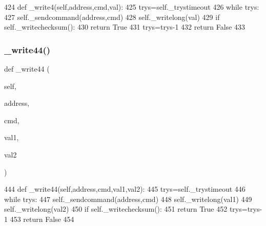 \begin{DoxyCode}
424     \textcolor{keyword}{def }\_write4(self,address,cmd,val):
425         trys=self.\_trystimeout
426         \textcolor{keywordflow}{while} trys:
427             self.\_sendcommand(address,cmd)
428             self.\_writelong(val)
429             \textcolor{keywordflow}{if} self.\_writechecksum():
430                 \textcolor{keywordflow}{return} \textcolor{keyword}{True}
431             trys=trys-1
432         \textcolor{keywordflow}{return} \textcolor{keyword}{False}
433 
\end{DoxyCode}
\mbox{\label{classtoxic__hardware_1_1roboclaw__3_1_1Roboclaw_a9c08af5c10d3a64f8fe7fc9ad06b0264}} 
\subsubsection{\texorpdfstring{\+\_\+write44()}{\_write44()}}
{\footnotesize\ttfamily def \+\_\+write44 (\begin{DoxyParamCaption}\item[{}]{self,  }\item[{}]{address,  }\item[{}]{cmd,  }\item[{}]{val1,  }\item[{}]{val2 }\end{DoxyParamCaption})\hspace{0.3cm}{\ttfamily [private]}}


\begin{DoxyCode}
444     \textcolor{keyword}{def }\_write44(self,address,cmd,val1,val2):
445         trys=self.\_trystimeout
446         \textcolor{keywordflow}{while} trys:
447             self.\_sendcommand(address,cmd)
448             self.\_writelong(val1)
449             self.\_writelong(val2)
450             \textcolor{keywordflow}{if} self.\_writechecksum():
451                 \textcolor{keywordflow}{return} \textcolor{keyword}{True}
452             trys=trys-1
453         \textcolor{keywordflow}{return} \textcolor{keyword}{False}
454 
\end{DoxyCode}
\mbox{\label{classtoxic__hardware_1_1roboclaw__3_1_1Roboclaw_a27bbed81507d1f977f95c828e84e807d}} 

